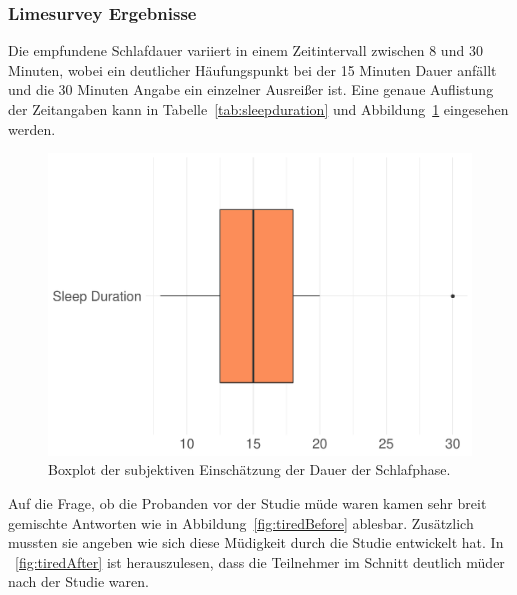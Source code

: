 \subsubsection{Limesurvey Ergebnisse}
Die empfundene Schlafdauer variiert in einem Zeitintervall zwischen 8 und 30 Minuten, wobei ein deutlicher Häufungspunkt bei der 15 Minuten Dauer anfällt und die 30 Minuten Angabe ein einzelner Ausreißer ist. Eine genaue Auflistung der Zeitangaben kann in Tabelle~\ref{tab:sleepduration} und Abbildung~\ref{fig:subjectiveSleepDuration} eingesehen werden.

\begin{figure}[H]
	\centering
	\includegraphics[width=\textwidth]{./_StudyResults/subjectiveSleepDuration}
	\caption{Boxplot der subjektiven Einschätzung der Dauer der Schlafphase.}
	\label{fig:subjectiveSleepDuration}
\end{figure}

Auf die Frage, ob die Probanden vor der Studie müde waren kamen sehr breit gemischte Antworten wie in Abbildung~\ref{fig:tiredBefore} ablesbar. Zusätzlich mussten sie angeben wie sich diese Müdigkeit durch die Studie entwickelt hat. In ~\ref{fig:tiredAfter} ist herauszulesen, dass die Teilnehmer im Schnitt deutlich müder nach der Studie waren.

